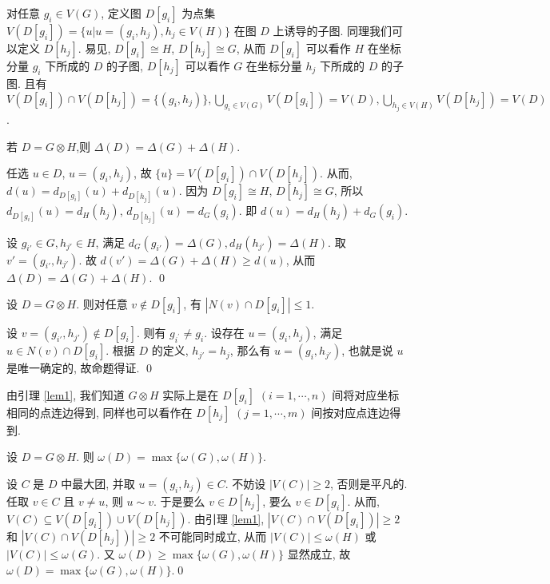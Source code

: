 \documentclass[12pt,a4paper]{article}%
\begin{document}
对任意 $g_i \in V(G)$, 定义图 $D[g_i]$ 为点集 $V(D[g_i]) =  \{ u|u = (g_i, h_j), h_j \in V(H) \}$ 在图 $D$ 上诱导的子图. 同理我们可以定义 $D[h_j]$. 易见, $D[g_i] \cong H$, $D[h_j] \cong G $, 从而 $D[g_i]$ 可以看作 $H$ 在坐标分量 $g_i$ 下所成的 $D$ 的子图, $D[h_j]$ 可以看作 $G$ 在坐标分量 $h_j$ 下所成的 $D$ 的子图. 且有 $V(D[g_i])\cap V(D[h_j]) =\{ (g_i,h_j) \}, \underset {g_i \in V(G)}{\bigcup} V(D[g_i]) = V(D), \underset {h_j \in V(H)}{\bigcup} V(D[h_j]) = V(D)$. 

\begin{lemma}\label{lem0}
    若 $D = G \otimes H$,则 $\Delta (D) = \Delta (G) + \Delta (H)$.
\end{lemma} 

\begin{pf}\label{pf1}
    任选 $ u\in D$, $u = (g_i,h_j)$, 故 $\{u\}=V(D[g_i])\cap V(D[h_j])$. 从而, $d(u) = d_{D[g_i] }(u) + d_{D[h_j]}(u)$.
    因为 $D[g_i] \cong H$, $D[h_j] \cong G $, 所以 $d_{D[g_i] }(u)= d_{H}(h_j)$, $d_{D[h_j] }(u)= d_{G}(g_i)$. 即 $d(u)= d_{H}(h_j)+ d_{G}(g_i)$.
    
    设 $ g_{i'} \in G, h_{j'} \in H$, 满足 $d_{G}(g_{i'}) = \Delta (G),d_{H}(h_{j'}) = \Delta (H)$.
    取 $v' = (g_{i'},h_{j'})$. 故 $d(v') = \Delta (G) + \Delta (H) \ge d(u)$,
    从而 $\Delta(D) = \Delta(G) + \Delta(H)$.  \qed

\end{pf}

\begin{lemma}\label{lem1}
   设 $D = G \otimes H $. 则对任意 $v\notin D[g_i]$, 有 $|N(v)\cap D[g_i]|\leq 1$.
\end{lemma}

\begin{pf}
    设 $v = (g_{i'},h_{j'}) \not\in D[g_i]$. 则有 $g_{i^{'}} \neq g_i$. 设存在 $u = (g_i,h_j)$, 满足 $ u\in N(v)\cap D[g_i]$. 根据 $D$ 的定义, $h_{j'} =  h_j$, 那么有 $u = (g_i,h_{j'})$, 也就是说 $ u$ 是唯一确定的, 故命题得证. \qed
\end{pf}

由引理 \ref{lem1}, 我们知道 $G \otimes H$ 实际上是在 $D[g_i] $ $(i = 1,\cdots, n)$ 间将对应坐标相同的点连边得到, 同样也可以看作在 $D[h_j]$ $(j = 1,\cdots,m)$ 间按对应点连边得到.

\begin{lemma}\label{lem2}
    设 $D = G \otimes H$. 则 $\omega (D) = \max\{ \omega (G),\omega (H)\}$.
\end{lemma}

\begin{pf}
    设 $C$ 是 $D$ 中最大团, 并取 $u = (g_i,h_j)\in C$. 不妨设 $|V(C)|\geq 2$, 否则是平凡的. 任取 $ v \in C$ 且 $v \neq u$, 则 $u \sim v $. 于是要么 
    $v \in D[h_j]$, 要么  $v \in D[g_i]$. 从而, $V(C) \subseteq V(D[g_i])\cup V( D[h_j])$. 由引理 \ref{lem1}, $|V(C) \cap V(D[g_i])|\ge 2$ 和 $|V(C) \cap V(D[h_j])| \ge 2$ 不可能同时成立, 从而 $|V(C)| \le \omega(H)$ 或 $|V(C)| \le \omega(G).$
    又 $\omega(D) \ge \max\{ \omega(G),\omega(H)\}$ 显然成立, 故 $\omega(D) = \max\{ \omega(G),\omega(H)\}$.\qed
\end{pf}
\end{document}
